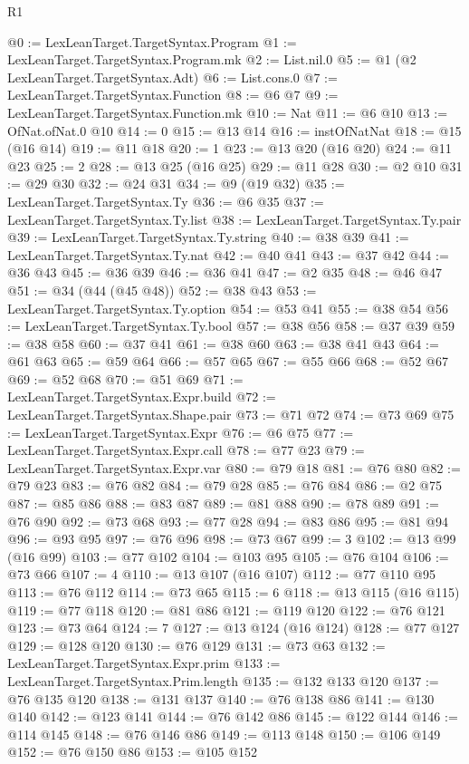 \begin{lexlean}{R1}
\begin{coremodule}
@0 := LexLeanTarget.TargetSyntax.Program
@1 := LexLeanTarget.TargetSyntax.Program.mk
@2 := List.nil.{0}
@5 := @1 (@2 LexLeanTarget.TargetSyntax.Adt)
@6 := List.cons.{0}
@7 := LexLeanTarget.TargetSyntax.Function
@8 := @6 @7
@9 := LexLeanTarget.TargetSyntax.Function.mk
@10 := Nat
@11 := @6 @10
@13 := OfNat.ofNat.{0} @10
@14 := 0
@15 := @13 @14
@16 := instOfNatNat
@18 := @15 (@16 @14)
@19 := @11 @18
@20 := 1
@23 := @13 @20 (@16 @20)
@24 := @11 @23
@25 := 2
@28 := @13 @25 (@16 @25)
@29 := @11 @28
@30 := @2 @10
@31 := @29 @30
@32 := @24 @31
@34 := @9 (@19 @32)
@35 := LexLeanTarget.TargetSyntax.Ty
@36 := @6 @35
@37 := LexLeanTarget.TargetSyntax.Ty.list
@38 := LexLeanTarget.TargetSyntax.Ty.pair
@39 := LexLeanTarget.TargetSyntax.Ty.string
@40 := @38 @39
@41 := LexLeanTarget.TargetSyntax.Ty.nat
@42 := @40 @41
@43 := @37 @42
@44 := @36 @43
@45 := @36 @39
@46 := @36 @41
@47 := @2 @35
@48 := @46 @47
@51 := @34 (@44 (@45 @48))
@52 := @38 @43
@53 := LexLeanTarget.TargetSyntax.Ty.option
@54 := @53 @41
@55 := @38 @54
@56 := LexLeanTarget.TargetSyntax.Ty.bool
@57 := @38 @56
@58 := @37 @39
@59 := @38 @58
@60 := @37 @41
@61 := @38 @60
@63 := @38 @41 @43
@64 := @61 @63
@65 := @59 @64
@66 := @57 @65
@67 := @55 @66
@68 := @52 @67
@69 := @52 @68
@70 := @51 @69
@71 := LexLeanTarget.TargetSyntax.Expr.build
@72 := LexLeanTarget.TargetSyntax.Shape.pair
@73 := @71 @72
@74 := @73 @69
@75 := LexLeanTarget.TargetSyntax.Expr
@76 := @6 @75
@77 := LexLeanTarget.TargetSyntax.Expr.call
@78 := @77 @23
@79 := LexLeanTarget.TargetSyntax.Expr.var
@80 := @79 @18
@81 := @76 @80
@82 := @79 @23
@83 := @76 @82
@84 := @79 @28
@85 := @76 @84
@86 := @2 @75
@87 := @85 @86
@88 := @83 @87
@89 := @81 @88
@90 := @78 @89
@91 := @76 @90
@92 := @73 @68
@93 := @77 @28
@94 := @83 @86
@95 := @81 @94
@96 := @93 @95
@97 := @76 @96
@98 := @73 @67
@99 := 3
@102 := @13 @99 (@16 @99)
@103 := @77 @102
@104 := @103 @95
@105 := @76 @104
@106 := @73 @66
@107 := 4
@110 := @13 @107 (@16 @107)
@112 := @77 @110 @95
@113 := @76 @112
@114 := @73 @65
@115 := 6
@118 := @13 @115 (@16 @115)
@119 := @77 @118
@120 := @81 @86
@121 := @119 @120
@122 := @76 @121
@123 := @73 @64
@124 := 7
@127 := @13 @124 (@16 @124)
@128 := @77 @127
@129 := @128 @120
@130 := @76 @129
@131 := @73 @63
@132 := LexLeanTarget.TargetSyntax.Expr.prim
@133 := LexLeanTarget.TargetSyntax.Prim.length
@135 := @132 @133 @120
@137 := @76 @135 @120
@138 := @131 @137
@140 := @76 @138 @86
@141 := @130 @140
@142 := @123 @141
@144 := @76 @142 @86
@145 := @122 @144
@146 := @114 @145
@148 := @76 @146 @86
@149 := @113 @148
@150 := @106 @149
@152 := @76 @150 @86
@153 := @105 @152

\end{coremodule}
\end{lexlean}
